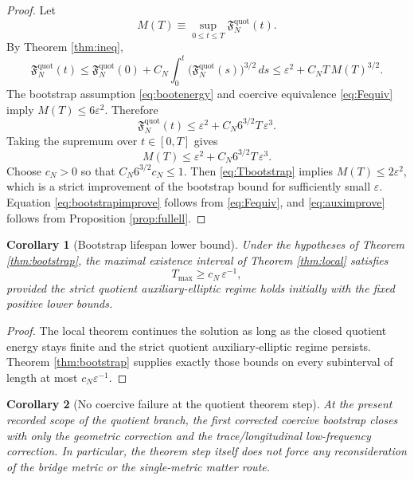 \documentclass[11pt]{article}
\newtheorem{corollary}{Corollary}
\begin{document}
\begin{proof}
Let
\[
M(T)\equiv \sup_{0\le t\le T}\mathfrak F_N^{\mathrm{quot}}(t).
\]
By Theorem \ref{thm:ineq},
\[
\mathfrak F_N^{\mathrm{quot}}(t)
\le
\mathfrak F_N^{\mathrm{quot}}(0)
+C_N\int_0^t
\bigl(\mathfrak F_N^{\mathrm{quot}}(s)\bigr)^{3/2}\,ds
\le
\varepsilon^2+C_NT\,M(T)^{3/2}.
\]
The bootstrap assumption \eqref{eq:bootenergy} and coercive equivalence \eqref{eq:Fequiv} imply \(M(T)\le 6\varepsilon^2\). Therefore
\[
\mathfrak F_N^{\mathrm{quot}}(t)
\le
\varepsilon^2+C_N 6^{3/2}T\,\varepsilon^3.
\]
Taking the supremum over \(t\in[0,T]\) gives
\[
M(T)\le \varepsilon^2+C_N 6^{3/2}T\,\varepsilon^3.
\]
Choose \(c_N>0\) so that \(C_N6^{3/2}c_N\le 1\). Then \eqref{eq:Tbootstrap} implies \(M(T)\le 2\varepsilon^2\), which is a strict improvement of the bootstrap bound for sufficiently small \(\varepsilon\). Equation \eqref{eq:bootstrapimprove} follows from \eqref{eq:Fequiv}, and \eqref{eq:auximprove} follows from Proposition \ref{prop:fullell}.
\end{proof}

\begin{corollary}[Bootstrap lifespan lower bound]
\label{cor:lifespan}
Under the hypotheses of Theorem \ref{thm:bootstrap}, the maximal existence interval of Theorem \ref{thm:local} satisfies
\begin{equation}
T_{\max}\ge c_N\,\varepsilon^{-1},
\label{eq:lifespan}
\end{equation}
provided the strict quotient auxiliary-elliptic regime holds initially with the fixed positive lower bounds.
\end{corollary}

\begin{proof}
The local theorem continues the solution as long as the closed quotient energy stays finite and the strict quotient auxiliary-elliptic regime persists. Theorem \ref{thm:bootstrap} supplies exactly those bounds on every subinterval of length at most \(c_N\varepsilon^{-1}\).
\end{proof}

\begin{corollary}[No coercive failure at the quotient theorem step]
\label{cor:nofail}
At the present recorded scope of the quotient branch, the first corrected coercive bootstrap closes with only the geometric correction and the trace/longitudinal low-frequency correction. In particular, the theorem step itself does not force any reconsideration of the bridge metric or the single-metric matter route.
\end{corollary}
\end{document}
